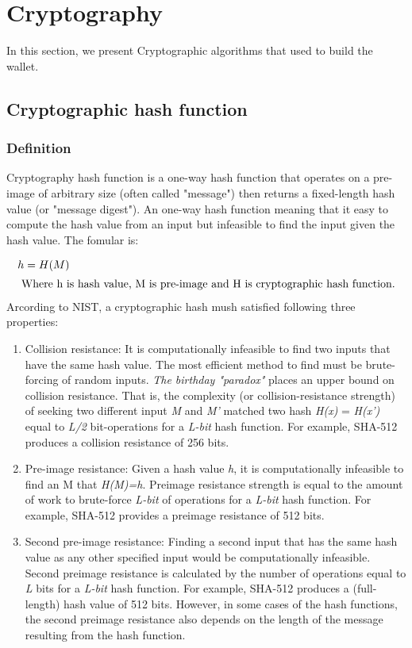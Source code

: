 \section{Cryptography}
In this section, we present Cryptographic algorithms that used to build the wallet.

\subsection{Cryptographic hash function}
\label{sec:crypto_hash}
\subsubsection{Definition}
Cryptography hash function is a one-way hash function that operates on a pre-image of arbitrary size (often called "message") then returns a fixed-length hash value (or "message digest"). 
An one-way hash function meaning that it easy to compute the hash value from an input but infeasible to find the input given the hash value.
The fomular is:

\begin{align*}
	h  &= H(M) \\ \intertext{ Where h is hash value, M is pre-image and H is cryptographic hash function.}
\end{align*}
Arcording to NIST, a cryptographic hash mush satisfied following three properties:

\begin{enumerate}	
	\item Collision resistance: It is computationally infeasible to find two inputs that have the same hash value. 
	The most efficient method to find must be brute-forcing of random inputs.
	\emph{The birthday "paradox"} places an upper bound on collision resistance.
	That is, the complexity (or collision-resistance strength) of seeking two different input \emph{M} and \emph{M'} matched two hash \emph{H(x)} = \emph{H(x’)} equal to \emph{L/2} bit-operations for a \emph{L-bit} hash function. 
	For example, SHA-512 produces a collision resistance of 256 bits.

	\item Pre-image resistance: Given a hash value \emph{h}, it is computationally infeasible to find an M that \emph{H(M)=h}. 
	Preimage resistance strength is equal to the amount of work to brute-force \emph{L-bit} of operations for a \emph{L-bit} hash function. 
	For example, SHA-512 provides a preimage resistance of 512 bits.
	
	\item Second pre-image resistance: Finding a second input that has the same hash value as any other specified input would be computationally infeasible.
	Second preimage resistance is calculated by the number of operations equal to  \emph{L} bits for a \emph{L-bit} hash function. 
	For example, SHA-512 produces a (full-length) hash value of 512 bits.
	However, in some cases of the hash functions, the second preimage resistance also depends on the length of the message resulting from the hash function.

\end{enumerate}

